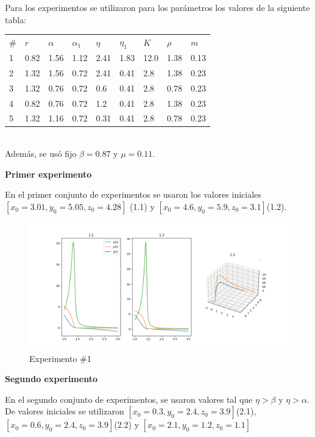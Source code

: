 \documentclass{wscpaperproc}
\theoremstyle{wsc}
\begin{document}
Para los experimentos se utilizaron para los parámetros los valores de la siguiente tabla:

\begin{tabular}{p{1cm} | p{1cm} | p{1cm} | p{1cm} | p{1cm} | p{1cm} | p{1cm} | p{1cm} | p{1cm} }
	$\#$ & $r$  & $\alpha$ & $\alpha_1$ & $\eta$ & $\eta_1$ & $K$  & $\rho$ & $m$  \\
	1    & 0.82 & 1.56     & 1.12       & 2.41   & 1.83     & 12.0 & 1.38   & 0.13 \\
	2    & 1.32 & 1.56     & 0.72       & 2.41   & 0.41     & 2.8  & 1.38   & 0.23 \\
	3    & 1.32 & 0.76     & 0.72       & 0.6    & 0.41     & 2.8  & 0.78   & 0.23 \\
	4    & 0.82 & 0.76     & 0.72       & 1.2    & 0.41     & 2.8  & 1.38   & 0.23 \\
	5    & 1.32 & 1.16     & 0.72       & 0.31   & 0.41     & 2.8  & 0.78   & 0.23 \\
\end{tabular}
\\

Además, se usó fijo $\beta=0.87$ y $\mu=0.11$.

\vspace*{0.5cm}
{\bf Primer experimento}

En el primer conjunto de experimentos se usaron los valores iniciales $[x_0=3.01, y_0=5.05, z_0=4.28]$ (1.1)
y $[x_0=4.6, y_0=5.9, z_0=3.1]$(1.2).

\begin{figure}[h!]
	\includegraphics[width=\linewidth]{./images/1.png}
	\caption{Experimento \#1}
\end{figure}

\vspace*{0.5cm}
{\bf Segundo experimento}

En el segundo conjunto de experimentos, se usaron valores tal que $\eta > \beta$ y $\eta > \alpha$.
De valores iniciales se utilizaron $[x_0=0.3, y_0=2.4, z_0=3.9]$(2.1),
$[x_0=0.6, y_0=2.4, z_0=3.9]$(2.2) y $[x_0=2.1, y_0=1.2, z_0=1.1]$
\end{document}
